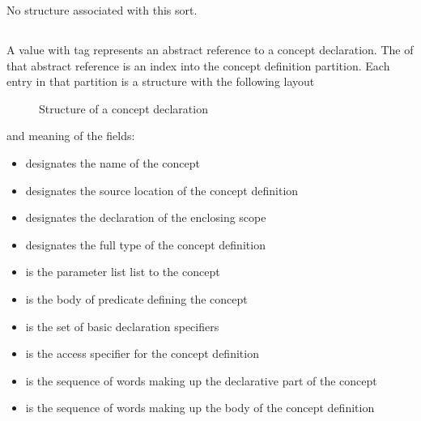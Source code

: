 No structure associated with this sort.

\subsection{}
\label{sec:ifc:DeclSort:Concept}

A  value with tag  represents an abstract reference
to a concept declaration.  The  of that abstract reference is an index into the concept
definition partition.  Each entry in that partition is a structure with the following layout
%
\begin{figure}[H]
	\centering
	\caption{Structure of a concept declaration}
	\label{fig:ifc-concept-decl-structure}
\end{figure}
%
and meaning of the fields:
\begin{itemize}
	\item {} designates the name of the concept
	\item {} designates the source location of the concept definition
	\item {} designates the declaration of the enclosing scope
	\item {} designates the full type of the concept definition
	\item {} is the parameter list list to the concept
	\item {} is the body of predicate defining the concept
	\item {} is the set of basic declaration specifiers
	\item {} is the access specifier for the concept definition
	\item {} is the sequence of words making up the declarative part of the concept
	\item {} is the sequence of words making up the body of the concept definition
\end{itemize}

